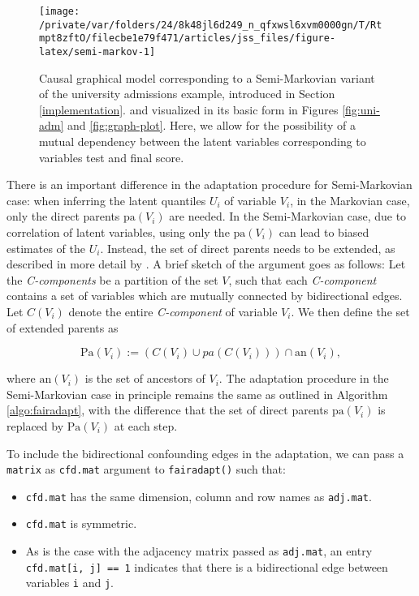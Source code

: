 \documentclass[
  nojss]{jss}
\providecommand{\tightlist}{%
  \setlength{\itemsep}{0pt}\setlength{\parskip}{0pt}}
\begin{document}
\begin{CodeChunk}
\begin{figure}

{\centering \texttt{[image: /private/var/folders/24/8k48jl6d249\_n\_qfxwsl6xvm0000gn/T/Rtmpt8zftO/filecbe1e79f471/articles/jss\_files/figure-latex/semi-markov-1]} 

}

\caption{Causal graphical model corresponding to a Semi-Markovian variant of the university admissions example, introduced in Section \ref{implementation}.  and visualized in its basic form in Figures \ref{fig:uni-adm} and \ref{fig:graph-plot}. Here, we allow for the possibility of a mutual dependency between the latent variables corresponding to variables test and final score.}\label{fig:semi-markov}
\end{figure}
\end{CodeChunk}

There is an important difference in the adaptation procedure for
Semi-Markovian case: when inferring the latent quantiles \(U_i\) of
variable \(V_i\), in the Markovian case, only the direct parents
\(\mathrm{pa}(V_i)\) are needed. In the Semi-Markovian case, due to
correlation of latent variables, using only the \(\mathrm{pa}(V_i)\) can
lead to biased estimates of the \(U_i\). Instead, the set of direct
parents needs to be extended, as described in more detail by
\citet{tian2002general}. A brief sketch of the argument goes as follows:
Let the \emph{C-components} be a partition of the set \(V\), such that
each \emph{C-component} contains a set of variables which are mutually
connected by bidirectional edges. Let \(C(V_i)\) denote the entire
\emph{C-component} of variable \(V_i\). We then define the set of
extended parents as

\[\mathrm{Pa}(V_i) := (C(V_i) \cup pa(C(V_i))) \cap \mathrm{an}(V_i),\]

where \(\mathrm{an}(V_i)\) is the set of ancestors of \(V_i\). The
adaptation procedure in the Semi-Markovian case in principle remains the
same as outlined in Algorithm \ref{algo:fairadapt}, with the difference
that the set of direct parents \(\mathrm{pa}(V_i)\) is replaced by
\(\mathrm{Pa}(V_i)\) at each step.

To include the bidirectional confounding edges in the adaptation, we can
pass a \texttt{matrix} as \texttt{cfd.mat} argument to
\texttt{fairadapt()} such that:

\begin{itemize}
\tightlist
\item
  \texttt{cfd.mat} has the same dimension, column and row names as
  \texttt{adj.mat}.
\item
  \texttt{cfd.mat} is symmetric.
\item
  As is the case with the adjacency matrix passed as \texttt{adj.mat},
  an entry \texttt{cfd.mat{[}i,\ j{]}\ ==\ 1} indicates that there is a
  bidirectional edge between variables \texttt{i} and \texttt{j}.
\end{itemize}
\end{document}
